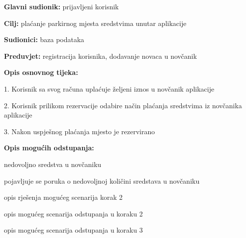 					\noindent {}
					\begin{packed_item}
						
						\item \textbf{Glavni sudionik: }prijavljeni korisnik
						\item  \textbf{Cilj:} plaćanje parkirnog mjesta sredstvima unutar aplikacije
						\item  \textbf{Sudionici:} baza podataka
						\item  \textbf{Preduvjet:} registracija korisnika, dodavanje novaca u novčanik
						\item  \textbf{Opis osnovnog tijeka:}
						
						\item[] \begin{packed_enum}
							
							\item 1. Korisnik sa svog računa uplaćuje željeni iznos u novčanik aplikacije
							\item 2. Korisnik prilikom rezervacije odabire način plaćanja sredstvima iz novčanika aplikacije
							\item 3. Nakon uspješnog plaćanja mjesto je rezervirano
						\end{packed_enum}
						
						\item  \textbf{Opis mogućih odstupanja:}
						
						\item[] \begin{packed_item}
							
							\item[2.a] nedovoljno sredstva u novčaniku
							\item[] \begin{packed_enum}
								
								\item pojavljuje se poruka o nedovoljnoj količini sredstava u novčaniku
								\item opis rješenja mogućeg scenarija korak 2
								
							\end{packed_enum}
							\item[2.b] opis mogućeg scenarija odstupanja u koraku 2
							\item[3.a] opis mogućeg scenarija odstupanja  u koraku 3
							
						\end{packed_item}
					\end{packed_item}
					
